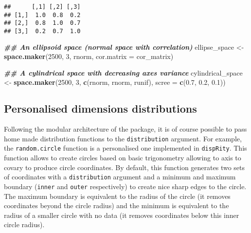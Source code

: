 \documentclass[
]{book}
\newenvironment{Shaded}{\begin{snugshade}}{\end{snugshade}}
\newcommand{\AttributeTok}[1]{\textcolor[rgb]{0.13,0.29,0.53}{#1}}
\newcommand{\DecValTok}[1]{\textcolor[rgb]{0.00,0.00,0.81}{#1}}
\newcommand{\DocumentationTok}[1]{\textcolor[rgb]{0.56,0.35,0.01}{\textbf{\textit{#1}}}}
\newcommand{\FloatTok}[1]{\textcolor[rgb]{0.00,0.00,0.81}{#1}}
\newcommand{\FunctionTok}[1]{\textcolor[rgb]{0.13,0.29,0.53}{\textbf{#1}}}
\newcommand{\NormalTok}[1]{#1}
\newcommand{\OtherTok}[1]{\textcolor[rgb]{0.56,0.35,0.01}{#1}}
\begin{document}
\begin{verbatim}
##      [,1] [,2] [,3]
## [1,]  1.0  0.8  0.2
## [2,]  0.8  1.0  0.7
## [3,]  0.2  0.7  1.0
\end{verbatim}

\begin{Shaded}
\begin{Highlighting}[]
\DocumentationTok{\#\# An ellipsoid space (normal space with correlation)}
\NormalTok{ellipse\_space }\OtherTok{\textless{}{-}} \FunctionTok{space.maker}\NormalTok{(}\DecValTok{2500}\NormalTok{, }\DecValTok{3}\NormalTok{, rnorm,}
                             \AttributeTok{cor.matrix =}\NormalTok{ cor\_matrix)}

\DocumentationTok{\#\# A cylindrical space with decreasing axes variance}
\NormalTok{cylindrical\_space }\OtherTok{\textless{}{-}} \FunctionTok{space.maker}\NormalTok{(}\DecValTok{2500}\NormalTok{, }\DecValTok{3}\NormalTok{, }\FunctionTok{c}\NormalTok{(rnorm, rnorm, runif),}
                                 \AttributeTok{scree =} \FunctionTok{c}\NormalTok{(}\FloatTok{0.7}\NormalTok{, }\FloatTok{0.2}\NormalTok{, }\FloatTok{0.1}\NormalTok{))}
\end{Highlighting}
\end{Shaded}

\hypertarget{personalised-dimensions-distributions}{%
\subsection{Personalised dimensions distributions}\label{personalised-dimensions-distributions}}

Following the modular architecture of the package, it is of course possible to pass home made distribution functions to the \texttt{distribution} argument.
For example, the \texttt{random.circle} function is a personalised one implemented in \texttt{dispRity}.
This function allows to create circles based on basic trigonometry allowing to axis to covary to produce circle coordinates.
By default, this function generates two sets of coordinates with a \texttt{distribution} argument and a minimum and maximum boundary (\texttt{inner} and \texttt{outer} respectively) to create nice sharp edges to the circle.
The maximum boundary is equivalent to the radius of the circle (it removes coordinates beyond the circle radius) and the minimum is equivalent to the radius of a smaller circle with no data (it removes coordinates below this inner circle radius).
\end{document}
